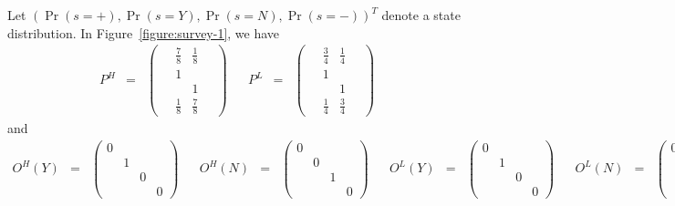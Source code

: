 Let $(\Pr (s = +), \Pr (s = Y), \Pr (s = N), \Pr (s = -))^T$ denote a
state distribution. In Figure~\ref{figure:survey-1}, we have
\[
  \begin{array}{rclcrcl}
    P^H & = &
      \left(
         \begin{array}{cccc}
           \  & \frac{7}{8} & \frac{1}{8} & \ \\
              &           1 &             &  \\
              &             &           1 &  \\
              & \frac{1}{8} & \frac{7}{8} &  
         \end{array}
      \right)
    & 
    &
    P^L & = &
      \left(
         \begin{array}{cccc}
           \  & \frac{3}{4} & \frac{1}{4} & \ \\
              &           1 &             &   \\
              &             &           1 &   \\
              & \frac{1}{4} & \frac{3}{4} &   
         \end{array}
      \right)
  \end{array}
\]
and
\[
  \begin{array}{rclcrclcrclcrcl}
    O^H (Y) & = &
      \left(
         \begin{array}{cccc}
           0 & \ & \ & \  \\
             & 1 &   &    \\
             &   & 0 &    \\
             &   &   &  0 
         \end{array}
      \right)
    &&
    O^H (N) & = &
      \left(
         \begin{array}{cccc}
           0 & \ & \ & \  \\
             & 0 &   &    \\
             &   & 1 &    \\
             &   &   &  0 
         \end{array}
      \right)
    &&
    O^L (Y) & = &
      \left(
         \begin{array}{cccc}
           0 & \ & \ & \  \\
             & 1 &   &    \\
             &   & 0 &    \\
             &   &   &  0 
         \end{array}
      \right)
    &&
    O^L (N) & = &
      \left(
         \begin{array}{cccc}
           0 & \ & \ & \  \\
             & 0 &   &    \\
             &   & 1 &    \\
             &   &   &  0 
         \end{array}
      \right)
  \end{array}
\]
